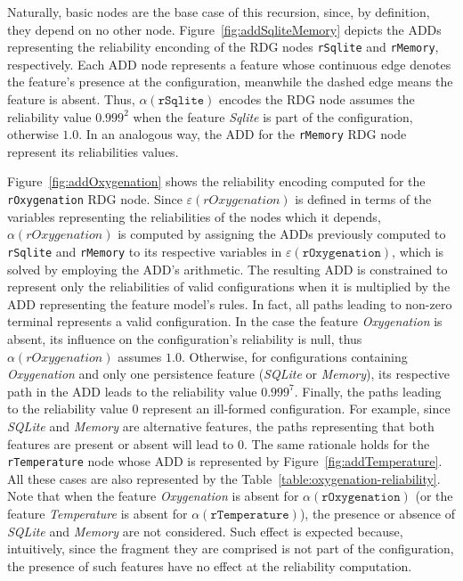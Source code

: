 Naturally, basic nodes are the base case of this recursion, since, by
definition, they depend on no other node. Figure~\ref{fig:addSqliteMemory}
depicts the ADDs representing the reliability enconding of the RDG nodes
\texttt{rSqlite} and \texttt{rMemory}, respectively. Each ADD node represents a
feature whose continuous edge denotes the feature's presence at the
configuration, meanwhile the dashed edge means the feature is absent.
Thus, $\alpha(\mathtt{rSqlite})$ encodes the RDG node assumes the reliability
value $0.999^2$ when the feature \emph{Sqlite} is part of the configuration,
otherwise $1.0$. In an analogous way, the ADD for the \texttt{rMemory} RDG node
represent its reliabilities values. 

Figure~\ref{fig:addOxygenation} shows the reliability encoding computed for the
\texttt{rOxygenation} RDG node. Since $\varepsilon(rOxygenation)$ is defined in
terms of the  variables representing the reliabilities of the nodes which it
depends, $\alpha(rOxygenation)$ is computed by assigning the ADDs previously
computed to \texttt{rSqlite} and \texttt{rMemory} to its respective variables in
$\varepsilon(\texttt{rOxygenation})$, which is solved by employing the ADD's
arithmetic. The resulting ADD is constrained to represent only the reliabilities
of valid configurations when it is multiplied by the ADD representing the
feature model's rules. In fact, all paths leading to non-zero terminal
represents a valid configuration. In the case the feature \emph{Oxygenation} is
absent, its influence on the configuration's reliability is null, thus
$\alpha(rOxygenation)$ assumes $1.0$.  Otherwise, for configurations containing
\emph{Oxygenation} and only one persistence feature (\emph{SQLite} or
\emph{Memory}), its respective path in the ADD leads to the reliability value
$0.999^7$. Finally, the paths leading to the reliability value $0$ represent an
ill-formed configuration. For example, since \emph{SQLite} and \emph{Memory} are
alternative features, the paths representing that both features are present or
absent will lead to $0$. The same rationale holds for the \texttt{rTemperature}
node whose ADD is represented by Figure~\ref{fig:addTemperature}. All these
cases are also represented by the Table~\ref{table:oxygenation-reliability}.
Note that when the feature \emph{Oxygenation} is absent for
$\alpha(\mathtt{rOxygenation})$ (or the feature \emph{Temperature} is absent
for $\alpha(\mathtt{rTemperature})$), the presence or absence of \emph{SQLite}
and \emph{Memory} are not considered. Such effect is expected because,
intuitively, since the fragment they are comprised is not part of the
configuration, the presence of such features have no effect at the reliability
computation.




